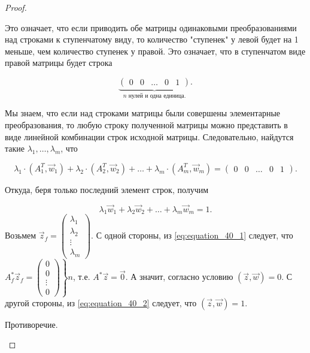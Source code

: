 \begin{proof}
\begin{description}
            Это означает, что если приводить обе матрицы одинаковыми преобразованиями над строками к ступенчатому виду, то количество "ступенек" у левой будет на 1 меньше, чем количество ступенек у правой. Это означает, что в ступенчатом виде правой матрицы будет строка

            $$\underbrace{\left(
                \begin{array}{cccc|c}
                    0 & 0 & \ldots & 0 & 1
                \end{array}
            \right)}_{n \text{ нулей и одна единица.}}.$$

            Мы знаем, что если над строками матрицы были совершены элементарные преобразования, то любую строку полученной матрицы можно представить в виде линейной комбинации строк исходной матрицы. Следовательно, найдутся такие $\lambda_1, \dots, \lambda_m$, что 

            \begin{equation}
                \lambda_1\cdot(A^T_1, \vec{w}_1) + \lambda_2\cdot(A^T_2, \vec{w}_2) + \ldots + \lambda_m\cdot(A^T_m, \vec{w}_m) = \begin{pmatrix}
                     0 & 0 & \ldots & 0 & 1
                 \end{pmatrix}.
                 \label{eq:equation_40_1}
            \end{equation}

            Откуда, беря только последний элемент строк, получим

            \begin{equation}
                \lambda_1\vec{w}_1 + \lambda_2\vec{w}_2 + \ldots + \lambda_m\vec{w}_m = 1.
                \label{eq:equation_40_2}
            \end{equation}
            Возьмем $\vec{z}_f = \begin{pmatrix}
                     \lambda_1 \\
                     \lambda_2 \\
                     \vdots \\
                     \lambda_m
                 \end{pmatrix}.$
            С одной стороны, из \eqref{eq:equation_40_1} следует, что $A^*_f\vec{z}_f = \left. \begin{pmatrix}
                 0 \\
                 0 \\
                 \vdots \\
                 0
             \end{pmatrix} \right\} n$, т.е. $A^*\vec{z} = \vec{0}$. А значит, согласно условию $(\vec{z}, \vec{w}) = 0$. С другой стороны, из \eqref{eq:equation_40_2} следует, что $(\vec{z}, \vec{w}) = 1$. 
             
             Противоречие.
    \end{description}
\end{proof}


